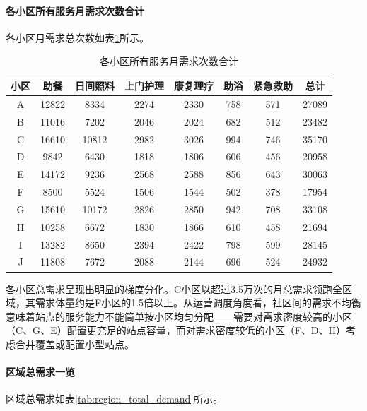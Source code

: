 \documentclass[UTF8]{ctexart}
\begin{document}
\paragraph{各小区所有服务月需求次数合计}
各小区月需求总次数如表\ref{tab:community_total_demand}所示。

\begin{table}[H]
\centering
\caption{各小区所有服务月需求次数合计}
\label{tab:community_total_demand}
\renewcommand{\arraystretch}{1.3}
\begin{tabular}{|c|c|c|c|c|c|c|c|}
\hline
\textbf{小区} & \textbf{助餐} & \textbf{日间照料} & \textbf{上门护理} & \textbf{康复理疗} & \textbf{助浴} & \textbf{紧急救助} & \textbf{总计} \\
\hline
A & 12822 & 8334 & 2274 & 2330 & 758 & 571 & 27089 \\
\hline
B & 11016 & 7202 & 2046 & 2024 & 682 & 512 & 23482 \\
\hline
C & 16610 & 10812 & 2982 & 3026 & 994 & 746 & 35170 \\
\hline
D & 9842 & 6430 & 1818 & 1806 & 606 & 456 & 20958 \\
\hline
E & 14172 & 9236 & 2568 & 2588 & 856 & 643 & 30063 \\
\hline
F & 8500 & 5524 & 1506 & 1544 & 502 & 378 & 17954 \\
\hline
G & 15610 & 10172 & 2826 & 2850 & 942 & 708 & 33108 \\
\hline
H & 10258 & 6672 & 1830 & 1866 & 610 & 458 & 21694 \\
\hline
I & 13282 & 8650 & 2394 & 2422 & 798 & 599 & 28145 \\
\hline
J & 11808 & 7672 & 2088 & 2144 & 696 & 524 & 24932 \\
\hline
\end{tabular}
\end{table}

各小区总需求呈现出明显的梯度分化。C小区以超过3.5万次的月总需求领跑全区域，其需求体量约是F小区的1.5倍以上。从运营调度角度看，社区间的需求不均衡意味着站点的服务能力不能简单按小区均匀分配——需要对需求密度较高的小区（C、G、E）配置更充足的站点容量，而对需求密度较低的小区（F、D、H）考虑合并覆盖或配置小型站点。

\paragraph{区域总需求一览}
区域总需求如表\ref{tab:region_total_demand}所示。
\end{document}
